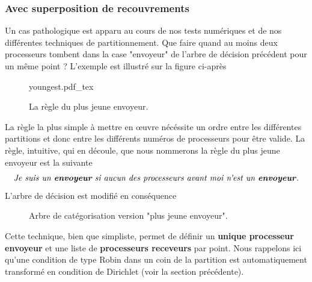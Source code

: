 \documentclass[a4paper,11pt]{article}
\newcommand{\incfig}[2]{%
	\def\svgwidth{#1\textwidth}
	\centering
	{#2.pdf_tex}
}
\begin{document}
\subsubsection{Avec superposition de recouvrements}
\noindent Un cas pathologique est apparu au cours de nos tests numériques et de nos différentes techniques de partitionnement. Que faire quand au moins deux processeurs tombent dans la case "envoyeur" de l'arbre de décision précédent pour un même point ?  L'exemple est illustré sur la figure ci-après
\begin{figure}[H]
	\incfig{0.6}{youngest}
	\caption{La règle du plus jeune envoyeur.}
\end{figure}
\noindent La règle la plus simple à mettre en \oe uvre nécéssite un ordre entre les différentes partitions et donc entre les différents numéros de processeurs pour être valide. La règle, intuitive, qui en découle, que nous nommerons la règle du plus jeune envoyeur est la suivante 
\begin{equation}
	\text{\textit{Je suis un \textbf{envoyeur} si aucun des processeurs avant moi n'est un \textbf{envoyeur}}}.\label{eq:younguest}
\end{equation}
L'arbre de décision est modifié en conséquence
\begin{figure}[H]
	\centering
	\caption{Arbre de catégorisation version "plus jeune envoyeur".}
\end{figure}
\noindent Cette technique, bien que simpliste, permet de définir un \textbf{unique processeur envoyeur} et une liste de \textbf{processeurs receveurs} par point. Nous rappelons ici qu'une condition de type Robin dans un coin de la partition est automatiquement transformé en condition de Dirichlet (voir la section précédente).\\
\end{document}
